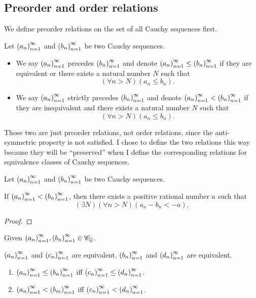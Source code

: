 \subsection{Preorder and order relations}

We define preorder relations on the set of all Cauchy sequences first.

\begin{definition}
    Let ${\left({a_{n}}\right)}^{\infty}_{n=1}$ and ${\left({b_{n}}\right)}^{\infty}_{n=1}$ be two Cauchy sequences.

    \begin{itemize}
        \item We say ${\left({a_{n}}\right)}^{\infty}_{n=1}$ precedes ${\left({b_{n}}\right)}^{\infty}_{n=1}$ and denote ${\left({a_{n}}\right)}^{\infty}_{n=1}\le{\left({b_{n}}\right)}^{\infty}_{n=1}$ if they are equivalent or there exists a natural number $N$ such that
              \[
                  (\forall n > N)(a_{n}\le b_{n}).
              \]
        \item We say ${\left({a_{n}}\right)}^{\infty}_{n=1}$ strictly precedes ${\left({b_{n}}\right)}^{\infty}_{n=1}$ and denote ${\left({a_{n}}\right)}^{\infty}_{n=1} < {\left({b_{n}}\right)}^{\infty}_{n=1}$ if they are inequivalent and there exists a natural number $N$ such that
              \[
                  (\forall n > N)(a_{n}\le b_{n}).
              \]
    \end{itemize}
\end{definition}

Those two are just preorder relations, not order relations, since the anti-symmetric property is not satisfied. I chose to define the two relations this way because they will be ``preserved'' when I define the corresponding relations for equivalence classes of Cauchy sequences.

\begin{theorem}
    Let ${\left({a_{n}}\right)}^{\infty}_{n=1}$ and ${\left({b_{n}}\right)}^{\infty}_{n=1}$ be two Cauchy sequences.

    If ${\left({a_{n}}\right)}^{\infty}_{n=1} < {\left({b_{n}}\right)}^{\infty}_{n=1}$, then there exists a positive rational number $a$ such that
    \[
        (\exists N)(\forall n > N)(a_{n} - b_{n} < -a).
    \]
\end{theorem}

\begin{proof}
\end{proof}

\begin{theorem}\label{theorem:chapter1:equivalent-cauchy-sequences-and-order}
    Given ${\left({a_{n}}\right)}^{\infty}_{n=1}, {\left({b_{n}}\right)}^{\infty}_{n=1}\in\mathscr{C}_{\mathbb{Q}}$.

    ${\left({a_{n}}\right)}^{\infty}_{n=1}$ and ${\left({c_{n}}\right)}^{\infty}_{n=1}$ are equivalent, ${\left({b_{n}}\right)}^{\infty}_{n=1}$ and ${\left({d_{n}}\right)}^{\infty}_{n=1}$ are equivalent.

    \begin{enumerate}[label={(\roman*)}]
        \item ${\left({a_{n}}\right)}^{\infty}_{n=1}\le{\left({b_{n}}\right)}^{\infty}_{n=1}$ iff ${\left({c_{n}}\right)}^{\infty}_{n=1}\le{\left({d_{n}}\right)}^{\infty}_{n=1}$.
        \item ${\left({a_{n}}\right)}^{\infty}_{n=1} < {\left({b_{m}}\right)}^{\infty}_{n=1}$ iff ${\left({c_{n}}\right)}^{\infty}_{n=1} < {\left({d_{n}}\right)}^{\infty}_{n=1}$.
    \end{enumerate}
\end{theorem}

